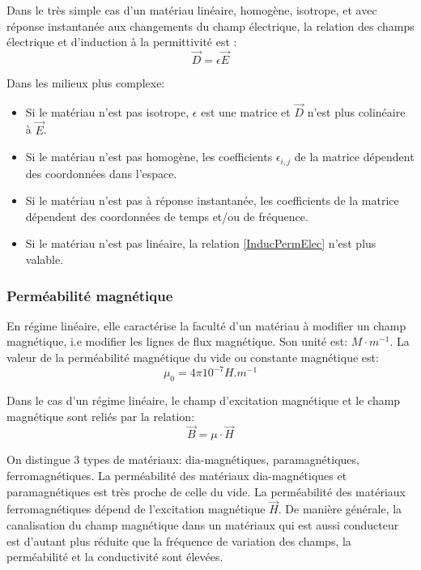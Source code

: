 \documentclass[10pt,a4paper]{article}
\begin{document}
Dans le très simple cas d'un matériau linéaire, homogène, isotrope, et avec réponse instantanée aux changements du champ électrique, la relation des champs électrique et d’induction à la permittivité est :
\begin{equation}
\overrightarrow{D} = \epsilon \overrightarrow{E}
\label{InducPermElec}
\end{equation}

Dans les milieux plus complexe:
\begin{itemize}
\item Si le matériau n'est pas isotrope, $\epsilon$ est une matrice et $\overrightarrow{D}$ n'est plus colinéaire à $\overrightarrow{E}$.
\item Si le matériau n'est pas homogène, les coefficients $\epsilon_{i,j}$ de la matrice dépendent des coordonnées dans l'espace.
\item Si le matériau n'est pas à réponse instantanée, les coefficients de la matrice dépendent des coordonnées de temps et/ou de fréquence.
\item Si le matériau n'est pas linéaire, la relation \ref{InducPermElec} n'est plus valable.
\end{itemize}


\subsubsection{Perméabilité magnétique \cite{permmag}}
En régime linéaire, elle caractérise la faculté d'un matériau à modifier un champ magnétique, i.e modifier les lignes de flux magnétique. Son unité est: $M\cdot m^{-1}$.
La valeur de la perméabilité magnétique du vide ou constante  magnétique est:
\begin{equation}
\mu_{0} = 4\pi 10^{-7} H.m^{-1}
\end{equation}

 Dans le cas d'un régime linéaire, le champ d'excitation magnétique et le champ magnétique sont reliés par la relation:
\begin{equation}
\overrightarrow{B} = \mu\cdot \overrightarrow{H}
\end{equation}

On distingue 3 types de matériaux: dia-magnétiques, paramagnétiques, ferromagnétiques. La perméabilité des matériaux dia-magnétiques et paramagnétiques est très proche de celle du vide. La perméabilité des matériaux ferromagnétiques dépend de l'excitation magnétique $\overrightarrow{H}$. De manière générale, la canalisation du champ magnétique dans un matériaux qui est aussi conducteur est d'autant plus réduite que la fréquence de variation des champs, la perméabilité et la conductivité sont élevées.
\end{document}
